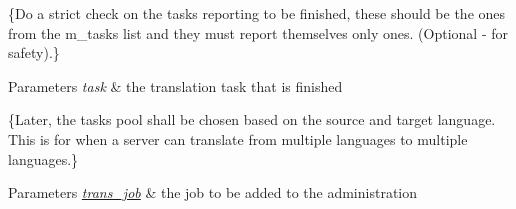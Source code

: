 \begin{DoxyRefList}
\item[\label{todo__todo000018}%
\hypertarget{todo__todo000018}{}%
Member \hyperlink{classuva_1_1smt_1_1bpbd_1_1server_1_1trans__job_ae1ca94b2972dc12e4bc0d8ae6604eae6}{uva\+:\+:smt\+:\+:bpbd\+:\+:server\+:\+:trans\+\_\+job\+:\+:notify\+\_\+task\+\_\+done} (const trans\+\_\+task\+\_\+ptr \&task)]\{Do a strict check on the tasks reporting to be finished, these should be the ones from the m\+\_\+tasks list and they must report themselves only ones. (Optional -\/ for safety).\} 
\begin{DoxyParams}{Parameters}
{\em task} & the translation task that is finished  \\
\hline
\end{DoxyParams}

\item[\label{todo__todo000019}%
\hypertarget{todo__todo000019}{}%
Member \hyperlink{classuva_1_1smt_1_1bpbd_1_1server_1_1trans__job__pool_a557da35b4def5a927fab613adb977286}{uva\+:\+:smt\+:\+:bpbd\+:\+:server\+:\+:trans\+\_\+job\+\_\+pool\+:\+:add\+\_\+job} (trans\+\_\+job\+\_\+ptr \hyperlink{classuva_1_1smt_1_1bpbd_1_1server_1_1trans__job}{trans\+\_\+job})]\{Later, the tasks pool shall be chosen based on the source and target language. This is for when a server can translate from multiple languages to multiple languages.\} 
\begin{DoxyParams}{Parameters}
{\em \hyperlink{classuva_1_1smt_1_1bpbd_1_1server_1_1trans__job}{trans\+\_\+job}} & the job to be added to the administration  \\
\hline
\end{DoxyParams}


\end{DoxyRefList}
